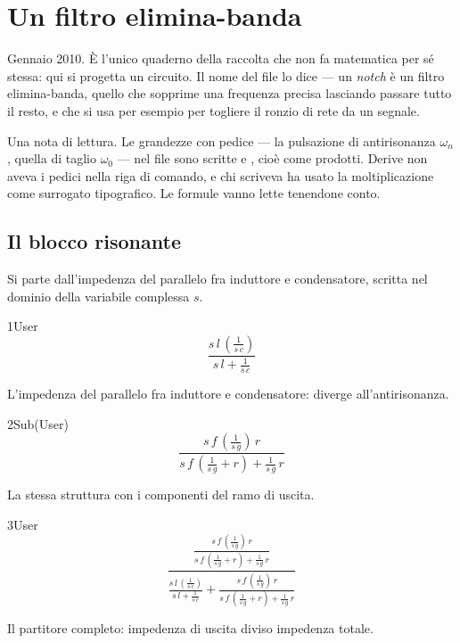 \chapter{Un filtro elimina-banda}
\label{cap:notch}

Gennaio 2010. È l'unico quaderno della raccolta che non fa matematica per sé stessa: qui si progetta un circuito. Il nome del file lo dice — un \emph{notch} è un filtro elimina-banda, quello che sopprime una frequenza precisa lasciando passare tutto il resto, e che si usa per esempio per togliere il ronzio di rete da un segnale.

Una nota di lettura. Le grandezze con pedice — la pulsazione di antirisonanza $\omega_n$, quella di taglio $\omega_0$ — nel file sono scritte  e , cioè come prodotti. Derive non aveva i pedici nella riga di comando, e chi scriveva ha usato la moltiplicazione come surrogato tipografico. Le formule vanno lette tenendone conto.

\section{Il blocco risonante}

Si parte dall'impedenza del parallelo fra induttore e condensatore, scritta nel dominio della variabile complessa $s$.

\begin{espr}{1}{User}{}
\[
\frac{s\, l\, \left(\frac{1}{s\, c}\right)}{s\, l + \frac{1}{s\, c}}
\]
\end{espr}
L'impedenza del parallelo fra induttore e condensatore: diverge all'antirisonanza.

\begin{espr}{2}{Sub(User)}{}
\[
\frac{s\, f\, \left(\frac{1}{s\, g}\right)\, r}{s\, f\, \left(\frac{1}{s\, g} + r\right) + \frac{1}{s\, g}\, r}
\]
\end{espr}
La stessa struttura con i componenti del ramo di uscita.

\begin{espr}{3}{User}{}
\[
\frac{\frac{s\, f\, \left(\frac{1}{s\, g}\right)\, r}{s\, f\, \left(\frac{1}{s\, g} + r\right) + \frac{1}{s\, g}\, r}}{\frac{s\, l\, \left(\frac{1}{s\, c}\right)}{s\, l + \frac{1}{s\, c}} + \frac{s\, f\, \left(\frac{1}{s\, g}\right)\, r}{s\, f\, \left(\frac{1}{s\, g} + r\right) + \frac{1}{s\, g}\, r}}
\]
\end{espr}
Il partitore completo: impedenza di uscita diviso impedenza totale.

